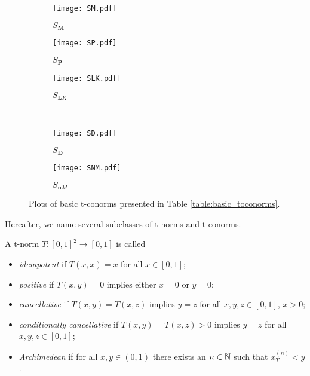 \begin{figure}[ht!]
	\centering
	\begin{subfigure}{.3\textwidth}
		\centering
		\texttt{[image: SM.pdf]}
		\caption{$S_{\bm M}$}
	\end{subfigure}\hspace{0.5cm}
	\begin{subfigure}{.3\textwidth}
		\centering
		\texttt{[image: SP.pdf]}
		\caption{$S_{\bm P}$}
	\end{subfigure}\hspace{0.5cm}
	\begin{subfigure}{.3\textwidth}
		\centering
		\texttt{[image: SLK.pdf]}
		\caption{$S_{\bm LK}$}
	\end{subfigure}\\
	\hspace{0.25cm}
	\begin{subfigure}{.4\textwidth}
		\centering
		\texttt{[image: SD.pdf]}
		\caption{$S_{\bm D}$}
	\end{subfigure}\hspace{0.25cm}
	\begin{subfigure}{.4\textwidth}
		\centering
		\texttt{[image: SNM.pdf]}
		\caption{$S_{\bm nM}$}
	\end{subfigure}
	\caption{Plots of basic t-conorms presented in Table \ref{table:basic_toconorms}.}\label{fig:basic_tconorms}
\end{figure}

Hereafter, we name several subclasses of t-norms and t-conorms.

\begin{definition} A t-norm $T:[0,1]^2 \to [0,1]$ is called
	\begin{itemize}
		\item \emph{idempotent} if $T(x,x)=x$ for all $x \in [0,1]$;
		\item \emph{positive} if $T(x,y)=0$ implies either $x=0$ or $y=0$;
		\item \emph{cancellative} if $T(x,y)=T(x,z)$ implies $y=z$ for all $x,y,z \in [0,1]$, $x>0$;
		\item \emph{conditionally cancellative} if $T(x,y)=T(x,z)>0$ implies $y=z$ for all $x,y,z \in [0,1]$;
		\item \emph{Archimedean} if for all $x,y \in (0,1)$ there exists an $n \in \mathbb{N}$ such that $x_T^{(n)}<y$.
	\end{itemize}
\end{definition}

